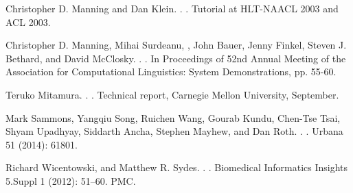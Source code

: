 \documentclass[11pt]{article}
\begin{document}
\begin{thebibliography}{}
{Christopher D. Manning and Dan Klein}.
.
.
\newblock Tutorial at HLT-NAACL 2003 and ACL 2003.

{Christopher D. Manning, Mihai Surdeanu, , John Bauer, Jenny Finkel, Steven J. Bethard, and David McClosky}.
.
.
\newblock In Proceedings of 52nd Annual Meeting of the Association for Computational Linguistics: System Demonstrations, pp. 55-60. 

{Teruko Mitamura}.
.
.
\newblock Technical report, Carnegie Mellon University, September.

{Mark Sammons, Yangqiu Song, Ruichen Wang, Gourab Kundu, Chen-Tse Tsai, Shyam Upadhyay, Siddarth Ancha, Stephen Mayhew, and Dan Roth}. .
.
\newblock Urbana 51 (2014): 61801.

{Richard Wicentowski, and Matthew R. Sydes}.
.
.
\newblock Biomedical Informatics Insights 5.Suppl 1 (2012): 51–60. PMC.





\end{thebibliography}
\end{document}
